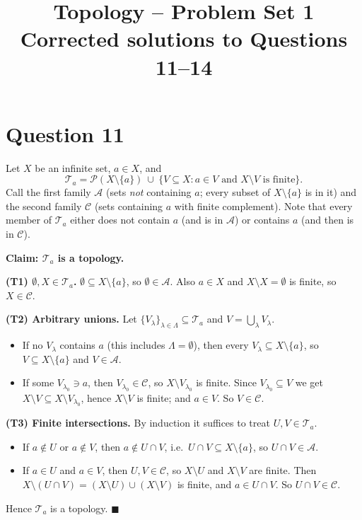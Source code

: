 \documentclass[11pt]{article}
\title{\textbf{Topology -- Problem Set 1}\\[2pt]\large Corrected solutions to Questions 11--14}
\author{}
\date{}
\newcommand{\Pow}{\mathcal{P}}
\newcommand{\T}{\mathcal{T}}
\begin{document}
\maketitle
\vspace{-2.5em}

\section*{Question 11}
Let $X$ be an infinite set, $a\in X$, and
\[
\T_a=\Pow(X\setminus\{a\})\ \cup\ \{V\subseteq X : a\in V\text{ and }X\setminus V\text{ is finite}\}.
\]
Call the first family $\mathcal A$ (sets \emph{not} containing $a$; every subset of $X\setminus\{a\}$ is in it) and the second family $\mathcal C$ (sets containing $a$ with finite complement). Note that every member of $\T_a$ either does not contain $a$ (and is in $\mathcal A$) or contains $a$ (and then is in $\mathcal C$).

\textbf{Claim: $\T_a$ is a topology.}

\textbf{(T1) $\emptyset,X\in\T_a$.} $\emptyset\subseteq X\setminus\{a\}$, so $\emptyset\in\mathcal A$. Also $a\in X$ and $X\setminus X=\emptyset$ is finite, so $X\in\mathcal C$.

\textbf{(T2) Arbitrary unions.} Let $\{V_\lambda\}_{\lambda\in\Lambda}\subseteq\T_a$ and $V=\bigcup_\lambda V_\lambda$.
\begin{itemize}[nosep]
\item If no $V_\lambda$ contains $a$ (this includes $\Lambda=\emptyset$), then every $V_\lambda\subseteq X\setminus\{a\}$, so $V\subseteq X\setminus\{a\}$ and $V\in\mathcal A$.
\item If some $V_{\lambda_0}\ni a$, then $V_{\lambda_0}\in\mathcal C$, so $X\setminus V_{\lambda_0}$ is finite. Since $V_{\lambda_0}\subseteq V$ we get $X\setminus V\subseteq X\setminus V_{\lambda_0}$, hence $X\setminus V$ is finite; and $a\in V$. So $V\in\mathcal C$.
\end{itemize}

\textbf{(T3) Finite intersections.} By induction it suffices to treat $U,V\in\T_a$.
\begin{itemize}[nosep]
\item If $a\notin U$ or $a\notin V$, then $a\notin U\cap V$, i.e.\ $U\cap V\subseteq X\setminus\{a\}$, so $U\cap V\in\mathcal A$.
\item If $a\in U$ and $a\in V$, then $U,V\in\mathcal C$, so $X\setminus U$ and $X\setminus V$ are finite. Then $X\setminus(U\cap V)=(X\setminus U)\cup(X\setminus V)$ is finite, and $a\in U\cap V$. So $U\cap V\in\mathcal C$.
\end{itemize}
Hence $\T_a$ is a topology. $\blacksquare$
\end{document}
